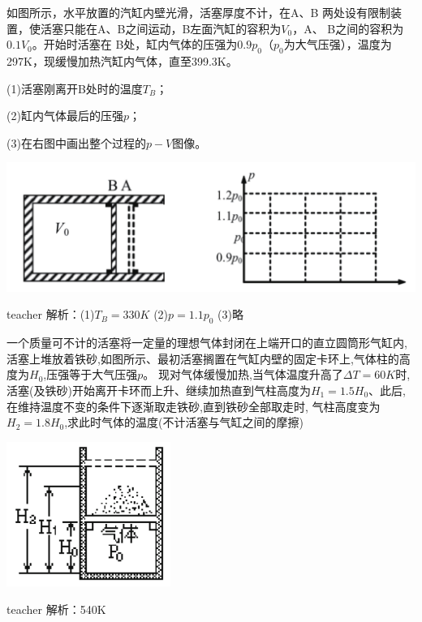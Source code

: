 \begin{example}
	如图所示，水平放置的汽缸内壁光滑，活塞厚度不计，在A、B 两处设有限制装置，使活塞只能在A、B之间运动，B左面汽缸的容积为$V_0$，A、 B之间的容积为$ 0.1V_0$。开始时活塞在 B处，缸内气体的压强为$ 0.9p_0$（$p_0$为大气压强），温度为297K，现缓慢加热汽缸内气体，直至399.3K。
	
	(1)活塞刚离开B处时的温度$ T_B$； 
	
	(2)缸内气体最后的压强$ p$； 
	
	(3)在右图中画出整个过程的$ p-V$图像。
	
	\begin{center}
		\includegraphics[width=0.6\linewidth]{images/thermal-1.pdf}
	\end{center}
	\begin{taggedblock}{teacher}
		\noindent
		解析：(1)$T_B=330K$    (2)$p=1.1p_0$    (3)略
	\end{taggedblock}
\end{example}


\begin{example}
	一个质量可不计的活塞将一定量的理想气体封闭在上端开口的直立圆筒形气缸内,活塞上堆放着铁砂,如图所示、最初活塞搁置在气缸内壁的固定卡环上,气体柱的高度为$ H_0$,压强等于大气压强$ p$。
	现对气体缓慢加热,当气体温度升高了$\Delta T=60K $时,活塞(及铁砂)开始离开卡环而上升、继续加热直到气柱高度为$ H_1=1.5H_0$、此后,在维持温度不变的条件下逐渐取走铁砂,直到铁砂全部取走时, 气柱高度变为$H_2=1.8H_0$,求此时气体的温度(不计活塞与气缸之间的摩擦)
		\begin{flushright}
			\includegraphics[width = 0.4\textwidth]{images/thermal-2.pdf} 
		\end{flushright}
	\begin{taggedblock}{teacher}
		\noindent
		解析：540K
	\end{taggedblock}
\end{example}


